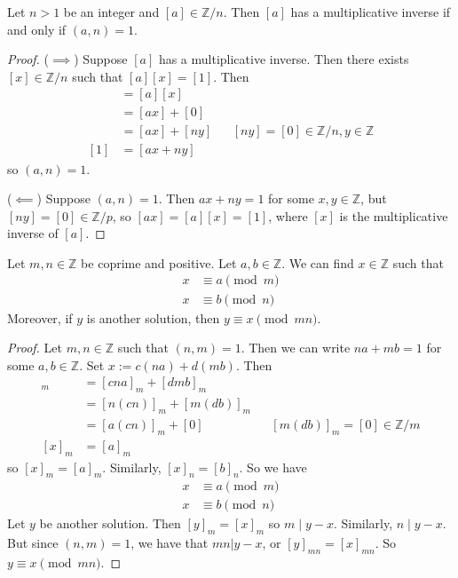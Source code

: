 \documentclass [12pt] {article}
\newcommand{\Z}{\mathbb{Z}}
\newenvironment{theorem}[1]{\begin{tcolorbox}[title={Theorem #1}]}{\end{tcolorbox}}
\begin{document}
\begin{theorem}{}
    Let $n > 1$ be an integer and $[a] \in \Z/n$. Then $[a]$ has a multiplicative inverse if and
    only if $(a, n) = 1$.
\end{theorem}
\begin{proof}
    ($\implies$)
    Suppose $[a]$ has a multiplicative inverse. Then there exists $[x] \in \Z/n$ such that 
    $[a][x] = [1]$. Then
    \begin{align*}
        [1] &= [a][x] \\
            &= [ax] + [0] \\ 
            &= [ax] + [ny] && [ny] = [0] \in \Z/n, y \in \Z \\
        [1] &= [ax + ny] 
    \end{align*}
    so $(a, n) = 1$.
    \vspace{0.5em}

    ($\impliedby$)
    Suppose $(a, n) = 1$. Then $ax + ny = 1$ for some $x, y \in \Z$, but $[ny] = [0] \in \Z/p$, so 
    $[ax] = [a][x] = [1]$, where $[x]$ is the multiplicative inverse of $[a]$.
\end{proof}

\begin{theorem}{Chinese Remainder Theorem}
    Let $m, n \in \Z$ be coprime and positive. Let $a, b \in \Z$. We can find $x \in \Z$ such that
    \begin{align*}
        x &\equiv a \pmod{m} \\
        x &\equiv b \pmod{n}
    \end{align*}
    Moreover, if $y$ is another solution, then $y \equiv x \pmod{mn}$.
\end{theorem}
\begin{proof}
    Let $m, n \in \Z$ such that $(n, m) = 1$. Then we can write $na + mb = 1$ for some $a, b \in \Z$.
    Set $x := c(na) + d(mb)$. Then
    \begin{align*}
        [x]_m &= [cna]_m + [dmb]_m \\ 
              &= [n(cn)]_m + [m(db)]_m \\ 
              &= [a(cn)]_m + [0] && [m(db)]_m = [0] \in \Z/m \\ 
        [x]_m &= [a]_m 
    \end{align*}
    so $[x]_m = [a]_m$. Similarly, $[x]_n = [b]_n$. So we have
    \begin{align*}
        x &\equiv a \pmod{m} \\
        x &\equiv b \pmod{n}
    \end{align*}
    Let $y$ be another solution. Then $[y]_m = [x]_m$ so $m \mid y - x$. Similarly, $n \mid y - x$.
    But since $(n, m) = 1$, we have that $mn | y - x$, 
    or $[y]_{mn} = [x]_{mn}$. So $y \equiv x \pmod{mn}$.
\end{proof}
\end{document}
